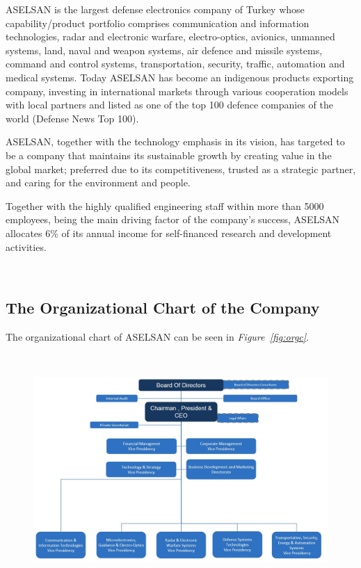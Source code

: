 	ASELSAN is the largest defense electronics company of Turkey whose capability/product portfolio comprises communication and information technologies, radar and electronic warfare, electro-optics, avionics, unmanned systems, land, naval and weapon systems, air defence and missile systems, command and control systems, transportation, security, traffic, automation and medical systems. Today ASELSAN has become an indigenous products exporting company, investing in international markets through various cooperation models with local partners and listed as one of the top 100 defence companies of the world (Defense News Top 100).

	ASELSAN, together with the technology emphasis in its vision, has targeted to be a company that maintains its sustainable growth by creating value in the global market; preferred due to its competitiveness, trusted as a strategic partner, and caring for the environment and people.

	Together with the highly qualified engineering staff within more than 5000 employees, being the main driving factor of the company's success, ASELSAN allocates 6\% of its annual income for self-financed research and development activities.

​​
\subsection{The Organizational Chart of the Company}
\-
\indent
The organizational chart of ASELSAN can be seen in \textit{Figure~\ref{fig:orgc}}.

\
\begin{figure}[H]
\center
\setlength{\unitlength}{\textwidth} 
\includegraphics[width=0.75\unitlength]{organizasyon}
\caption{\label{{fig:orgc}The Organizational Chart of ASELSAN }}
\end{figure}
	

